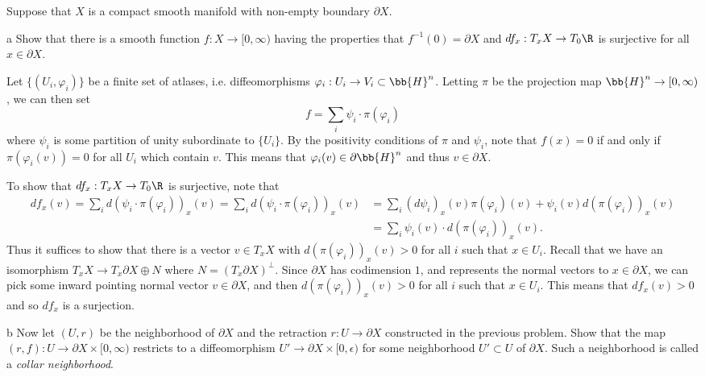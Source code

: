 \documentclass[11pt,letterpaper]{article}
\begin{document}
\begin{solution}
    \quad Suppose that $X$ is a compact smooth manifold with non-empty boundary $\partial X$.
    \begin{partproblem}{a}
        Show that there is a smooth function $f : X \to [0, \infty)$ having the properties that $f^{-1}(0)=\partial X$ and $df_x :T_xX \to T_0\R$ is surjective for all $x\in \partial X$. 
    \end{partproblem}

    \quad Let $\{(U_i, \varphi_i)\}$ be a finite set of atlases, i.e. diffeomorphisms $\varphi_i : U_i \to V_i\subset\bb{H}^n$. Letting $\pi$ be the projection map $\bb{H}^n \to [0,\infty)$, we can then set
    \[
        f = \sum_i \psi_i\cdot\pi(\varphi_i)
    \]
    where $\psi_i$ is some partition of unity subordinate to $\{U_i\}$. By the positivity conditions of $\pi$ and $\psi_i$, note that $f(x)=0$ if and only if $\pi(\varphi_i(v))=0$ for all $U_i$ which contain $v$. This means that $\varphi_i(v)\in \partial \bb{H}^n$ and thus $v\in \partial X$.

    \medskip
    \quad To show that $df_x : T_xX \to T_0\R$ is surjective, note that
    \[
        \begin{aligned}
            df_x(v) = \sum_i d(\psi_i\cdot \pi(\varphi_i))_x(v) = \sum_i d(\psi_i\cdot \pi(\varphi_i))_x(v) &= \sum_i (d\psi_i)_x(v) \pi(\varphi_i)(v) + \psi_i(v)d(\pi(\varphi_i))_x(v)\\
            &= \sum_i \psi_i(v)\cdot d(\pi(\varphi_i))_x(v).
        \end{aligned}
    \] 
    Thus it suffices to show that there is a vector $v\in T_xX$ with $d(\pi(\varphi_i))_x(v) > 0$ for all $i$ such that $x\in U_i$. Recall that we have an isomorphism $T_xX \to T_x\partial X\oplus N$ where $N=(T_x\partial X)^\perp$. Since $\partial X$ has codimension $1$, and represents the normal vectors to $x\in \partial X$, we can pick some inward pointing normal vector $v\in \partial X$, and then $d(\pi(\varphi_i))_x(v)>0$ for all $i$ such that $x\in U_i$. This means that $df_x(v)>0$ and so $df_x$ is a surjection.  

    \begin{partproblem}{b}
        Now let $(U,r)$ be the neighborhood of $\partial X$ and the retraction $r : U \to \partial X$ constructed in the previous problem. Show that the map $(r,f) : U \to \partial X\times [0,\infty)$ restricts to a diffeomorphism $U'\to \partial X \times [0,\epsilon)$ for some neighborhood $U'\subset U$ of $\partial X$. Such a neighborhood is called a \emph{collar neighborhood}. 
    \end{partproblem}


\end{solution}
\end{document}

